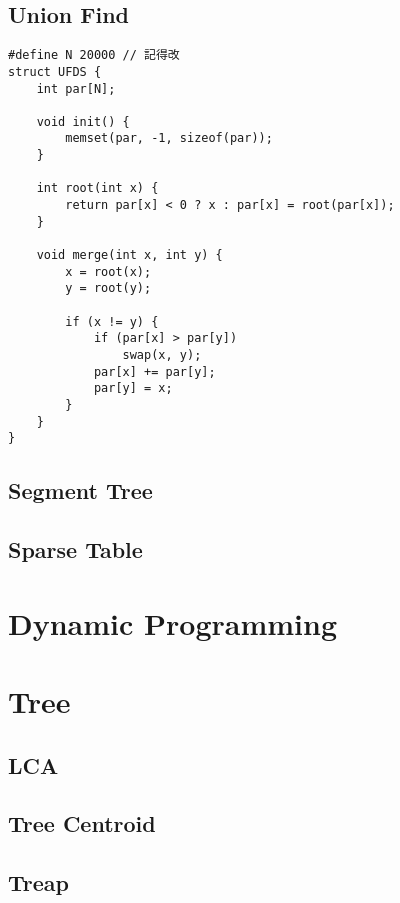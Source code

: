 \documentclass[10pt,oneside]{article}
\begin{document}
\begin{landscape}
\begin{multicols}{2}
\subsection{Union Find}

\begin{lstlisting}
#define N 20000 // 記得改
struct UFDS {
    int par[N];

    void init() {
        memset(par, -1, sizeof(par));
    }

    int root(int x) {
        return par[x] < 0 ? x : par[x] = root(par[x]);
    }

    void merge(int x, int y) {
        x = root(x);
        y = root(y);

        if (x != y) {
            if (par[x] > par[y])
                swap(x, y);
            par[x] += par[y];
            par[y] = x;
        }
    }
}
\end{lstlisting}

\subsection{Segment Tree}

\subsection{Sparse Table}



\section{Dynamic Programming}


\section{Tree}

\subsection{LCA}

\subsection{Tree Centroid}

\subsection{Treap}


\end{multicols}
\end{landscape}
\end{document}
